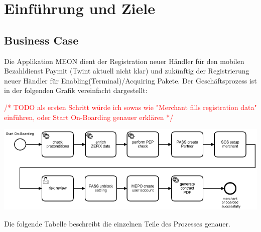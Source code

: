 \graphicspath{{./images/}}


\chapter{Einführung und Ziele}

\section{Business Case}
\label{businesscase}

Die Applikation MEON dient der Registration neuer Händler für den mobilen Bezahldienst Paymit (Twint aktuell nicht klar) und zukünftig der Registrierung neuer Händler für Enabling(Terminal)/Acquiring Pakete.  Der Geschäftsprozess ist in der folgenden Grafik vereinfacht dargestellt:

\textcolor{red}{/* TODO als ersten Schritt würde ich sowas wie "Merchant fills registration data" einführen, oder Start On-Boarding genauer erklären */}
\begin{center}
	\includegraphics[scale=0.4]{meon-workflow.png}
\end{center}

Die folgende Tabelle beschreibt die einzelnen Teile des Prozesses genauer.

